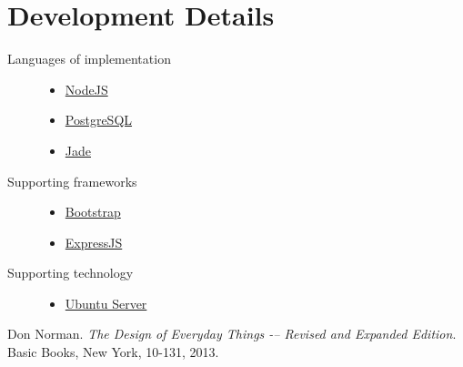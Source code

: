 \documentclass[12pt]{article}
\begin{document}
\section{Development Details}
\begin{description}
  \item[Languages of implementation] \hfill
    \begin{itemize}
      \item \href{https://nodejs.org/en/}{NodeJS}
      \item \href{http://www.postgresql.org/}{PostgreSQL}
      \item \href{http://jade-lang.com/}{Jade}
    \end{itemize}
  \item[Supporting frameworks] \hfill
    \begin{itemize}
      \item \href{http://getbootstrap.com/}{Bootstrap}
      \item \href{http://expressjs.com/}{ExpressJS}
    \end{itemize}
  \item[Supporting technology] \hfill
    \begin{itemize}
      \item \href{http://www.ubuntu.com/server}{Ubuntu Server}
    \end{itemize}
\end{description}

\begin{thebibliography}{9}
Don Norman.
\textit{The Design of Everyday Things -– Revised and Expanded Edition}.
Basic Books, New York, 10-131, 2013.
\end{thebibliography}
\end{document}
